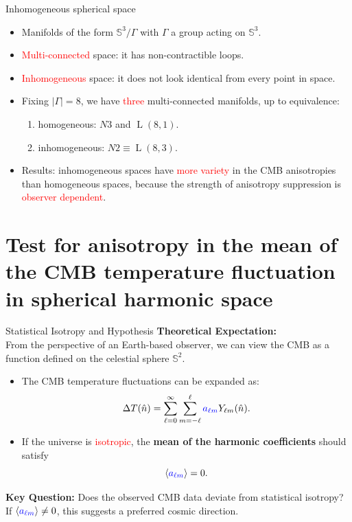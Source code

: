 \documentclass{beamer}
\DeclareMathOperator{\lensop}{L}
\newcommand*{\lens}[2]{\lensop\left(#1,#2\right)} %
\renewcommand{\S}{\mathbb{S}}
\begin{document}
\begin{frame}{Inhomogeneous spherical space}

	\begin{itemize}
		\pause
		\item Manifolds of the form $\S^3/\Gamma$ with $\Gamma$ a group acting on $\S^3$.
		\item \textcolor{red}{Multi-connected} space: it has non-contractible loops.
		\item \textcolor{red}{Inhomogeneous} space: it does not look identical from every point in space.
		      \pause
		\item Fixing $|\Gamma|=8$, we have \textcolor{red}{three} multi-connected manifolds, up to equivalence: \pause
		      \begin{enumerate}
			      \item homogeneous: $N3$ and $\lens 8 1 $.
			      \item inhomogeneous: $N2 \equiv \lens 8 3 $.
		      \end{enumerate}
		      \pause
		\item Results: inhomogeneous spaces have \textcolor{red}{more variety} in the CMB anisotropies than homogeneous spaces, because the strength of anisotropy suppression is \textcolor{red}{observer dependent}.
	\end{itemize}


\end{frame}

\section{Test for anisotropy in the mean of the CMB temperature fluctuation in spherical harmonic space}

\begin{frame}{Statistical Isotropy and Hypothesis}
	\small
	\textbf{Theoretical Expectation:}\\
	From the perspective of an Earth-based observer, we can view the CMB as a function defined on the celestial sphere $\mathbb{S}^2.$\\
	\begin{itemize}
		\pause
		\item The CMB temperature fluctuations can be expanded as:
		      \[
			      \Delta T(\hat{n}) = \sum_{\ell=0}^{\infty} \sum_{m=-\ell}^{\ell} \textcolor{blue}{a_{\ell m}}  Y_{\ell m}(\hat{n}).
		      \]
		      \pause
		\item If the universe is \textcolor{red}{isotropic}, the \textbf{mean of the harmonic coefficients} should satisfy
		      \[
			      \langle \textcolor{blue}{a_{\ell m}}  \rangle = 0.
		      \]
	\end{itemize}
	\pause
	\textbf{Key Question:}
	Does the observed CMB data deviate from statistical isotropy?
	If \( \langle \textcolor{blue}{a_{\ell m}} \rangle \neq 0 \), this suggests a preferred cosmic direction.
\end{frame}
\end{document}
